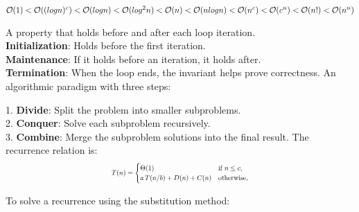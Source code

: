 \documentclass[a4paper,landscape]{article}
\newcommand{\bigo}{\mathcal{O}}
\begin{document}
\begin{multicols}{7} %
\tcolorbox[mybox={Facts}]

\tcblower

$\bigo(1)<\bigo((logn)^c)<\bigo(logn)\\<\bigo(log^2n)<\bigo(n)<\bigo(nlogn)\\<\bigo(n^c)<\bigo(c^n)<\bigo(n!)<\bigo(n^n)$

\endtcolorbox

\tcolorbox[mybox={Loop Invariant}]
A property that holds before and after each loop iteration.\\
\textbf{Initialization}: Holds before the first iteration.\\
\textbf{Maintenance}: If it holds before an iteration, it holds after.\\
\textbf{Termination}: When the loop ends, the invariant helps prove correctness.
\endtcolorbox
\tcolorbox[mybox={Divide and Conquer}]
An algorithmic paradigm with three steps:

1. \textbf{Divide}: Split the problem into smaller subproblems.\\
2. \textbf{Conquer}: Solve each subproblem recursively.\\
3. \textbf{Combine}: Merge the subproblem solutions into the final result.
The recurrence relation is:
\[
\scalebox{0.70}{$
T(n) =
\begin{cases}
\Theta(1) & \text{if } n \leq c, \\
a\,T(n/b) + D(n) + C(n) & \text{otherwise},
\end{cases}
$}
\]
\endtcolorbox

\tcolorbox[mybox={Solving Recurrences}]
To solve a recurrence using the substitution method:


\end{multicols}
\end{document}
